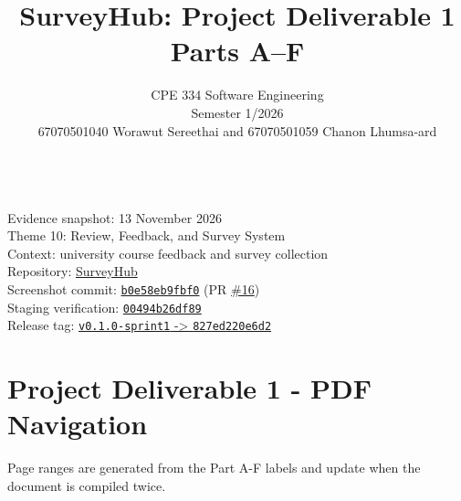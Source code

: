 \documentclass[12pt,a4paper]{article}
\title{\textbf{SurveyHub: Project Deliverable 1\\[2pt]Parts A--F}}
\author{CPE 334 Software Engineering\\Semester 1/2026\\[6pt]67070501040 Worawut Sereethai and 67070501059 Chanon Lhumsa-ard}
\date{}
\begin{document}
\maketitle
\begin{center}
\\[8pt]
Evidence snapshot: 13 November 2026\\Theme 10: Review, Feedback, and Survey System\\Context: university course feedback and survey collection\\Repository: \href{https://github.com/Snnn3/SurveyHub}{SurveyHub}\\Screenshot commit: \href{https://github.com/Snnn3/SurveyHub/commit/b0e58eb9fbf066bc56ef5197ea5d39174f6afe76}{\texttt{b0e58eb9fbf0}} (PR \href{https://github.com/Snnn3/SurveyHub/pull/16}{\#16})\\Staging verification: \href{https://github.com/Snnn3/SurveyHub/commit/00494b26df89892066c2680e0a03e0cc03c905a7}{\texttt{00494b26df89}}\\Release tag: \href{https://github.com/Snnn3/SurveyHub/commit/827ed220e6d2290193df7d5234ed3b757ec38988}{\texttt{v0.1.0-sprint1} -> \texttt{827ed220e6d2}}
\end{center}
\setcounter{page}{1}
\tableofcontents
\newpage
\clearpage
\section*{Project Deliverable 1 - PDF Navigation}
{}
Page ranges are generated from the Part A-F labels and update when the document is compiled twice.
\end{document}
